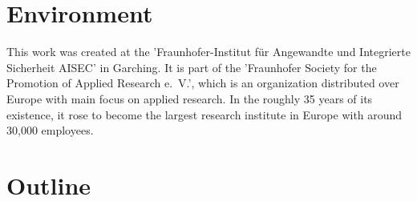 \section{Environment}

This work was created at the 'Fraunhofer-Institut für Angewandte und Integrierte Sicherheit AISEC' in Garching.
It is part of the 'Fraunhofer Society for the Promotion of Applied Research e.~V.', which is an organization distributed over Europe with main focus on applied research.
In the roughly 35 years of its existence, it rose to become the largest research institute in Europe with around 30,000 employees.

\section{Outline}

